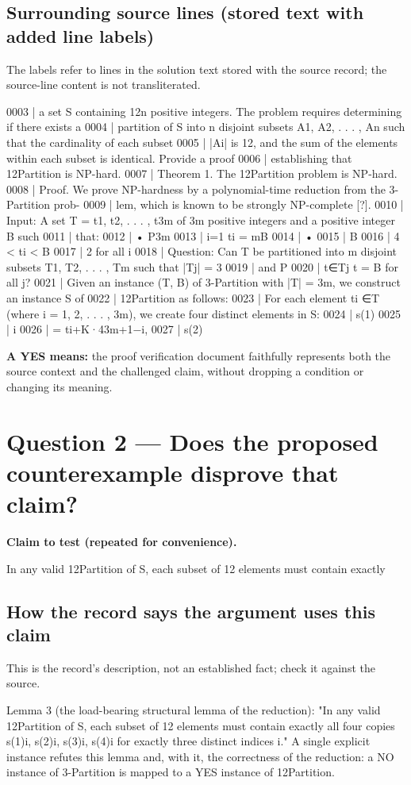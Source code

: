 \documentclass[11pt]{article}
\begin{document}
\subsection*{Surrounding source lines (stored text with added line labels)}
The labels refer to lines in the solution text stored with the source record; the source-line content is not transliterated.
\begin{Vsrc}
0003 | a set S containing 12n positive integers. The problem requires determining if there exists a
0004 | partition of S into n disjoint subsets A1, A2, . . . , An such that the cardinality of each subset
0005 | |Ai| is 12, and the sum of the elements within each subset is identical. Provide a proof
0006 | establishing that 12Partition is NP-hard.
0007 | Theorem 1. The 12Partition problem is NP-hard.
0008 | Proof. We prove NP-hardness by a polynomial-time reduction from the 3-Partition prob-
0009 | lem, which is known to be strongly NP-complete [?].
0010 | Input: A set T = {t1, t2, . . . , t3m} of 3m positive integers and a positive integer B such
0011 | that:
0012 | • P3m
0013 | i=1 ti = mB
0014 | •
0015 | B
0016 | 4 < ti < B
0017 | 2 for all i
0018 | Question: Can T be partitioned into m disjoint subsets T1, T2, . . . , Tm such that |Tj| = 3
0019 | and P
0020 | t∈Tj t = B for all j?
0021 | Given an instance (T, B) of 3-Partition with |T| = 3m, we construct an instance S of
0022 | 12Partition as follows:
0023 | For each element ti ∈T (where i = 1, 2, . . . , 3m), we create four distinct elements in S:
0024 | s(1)
0025 | i
0026 | = ti+K·43m+1−i,
0027 | s(2)
\end{Vsrc}
\textbf{A YES means:} the proof verification document faithfully represents both the source context and the challenged claim, without dropping a condition or changing its meaning.
\section*{Question 2 --- Does the proposed counterexample disprove that claim?}
\textbf{Claim to test (repeated for convenience).}
\begin{Vsrc}
In any valid 12Partition of S, each subset of 12 elements must contain exactly
\end{Vsrc}
\subsection*{How the record says the argument uses this claim}
This is the record's description, not an established fact; check it against the source.
\begin{Vsrc}
Lemma 3 (the load-bearing structural lemma of the reduction): "In any valid 12Partition of S, each subset of 12 elements must contain exactly all four copies s(1)i, s(2)i, s(3)i, s(4)i for exactly three distinct indices i." A single explicit instance refutes this lemma and, with it, the correctness of the reduction: a NO instance of 3-Partition is mapped to a YES instance of 12Partition.
\end{Vsrc}
\end{document}

